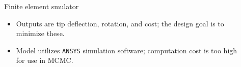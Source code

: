 \documentclass[final]{beamer}
\newlength{\sepwid}
\newlength{\onecolwid}
\newlength{\twocolwid}
\begin{document}
\begin{frame}[t]
\begin{columns}[t]
\begin{column}{\onecolwid}
\begin{alertblock}{Finite element smulator}
\begin{itemize}

\item Outputs are tip deflection, rotation, and cost; the design goal is to minimize these.

\item Model utilizes \texttt{ANSYS} simulation software; computation cost is too high for use in MCMC.


\end{itemize}
\end{alertblock}





%
%
%
%


\end{column} %



\begin{column}{\sepwid}\end{column} %

\begin{column}{\twocolwid} %



\end{column}
\end{columns}
\end{frame}
\end{document}
